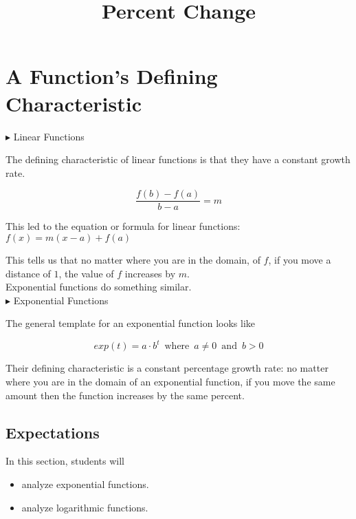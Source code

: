 \documentclass{ximera}
\title{Percent Change}
\begin{document}
\begin{abstract}
\end{abstract}
\maketitle




\section{A Function's Defining Characteristic}




$\blacktriangleright$ Linear Functions

The defining characteristic of linear functions is that they have a constant growth rate.


\[   \frac{f(b)-f(a)}{b-a} = m       \]

This led to the equation or formula for linear functions:  $f(x) = m(x-a) + f(a)$


This tells us that no matter where you are in the domain, of $f$, if you move a distance of $1$, the value of $f$ increases by $m$. \\


Exponential functions do something similar. \\





$\blacktriangleright$ Exponential Functions



The general template for an exponential function looks like 

\[   exp(t) = a \cdot b^t   \, \text{ where } \,  a \ne 0  \, \text{ and } \,    b > 0   \]



Their defining characteristic is a constant percentage growth rate: no matter where you are in the domain of an exponential function, if you move the same amount then the function increases by the same percent.





\subsection{Expectations}



\begin{sectionOutcomes}
In this section, students will 

\begin{itemize}
\item analyze exponential functions.
\item analyze logarithmic functions.
\end{itemize}
\end{sectionOutcomes}
\end{document}
